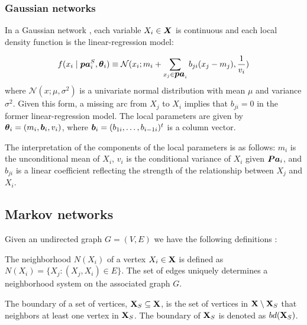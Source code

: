 \documentclass[a4paper]{article}
\begin{document}
\subsubsection{Gaussian networks}


In a Gaussian network \cite{Shachter_and_Kenley:1989}, each variable $X_i \in \mbox{\boldmath $X$}$ is continuous and
each local density function is the linear-regression model:

\begin{equation}
f (x{_i} \mid \mbox{\boldmath $pa$}_{i}^{S}, \mbox{\boldmath $\theta$}_i) \equiv  {\mathcal{N}} (x_i; m_i + \sum _{x_{j} \in \mbox{\boldmath $pa$}_{i}} b_{ji} (x_j - m_j), \frac{1}{v_i})
\end{equation}
where ${\mathcal{N}} (x; \mu, \sigma^{2})$ is a univariate normal
distribution with mean $\mu$ and variance $\sigma^{2}$. Given this form, a missing arc from $X_j$ to $X_i$
implies that $b_{ji} = 0$ in the former linear-regression model.
The local parameters are given by  $\mbox{\boldmath $\theta$}_i =
(m_i,  \mbox{\boldmath $b$}_i, v_i)$, where $\mbox{\boldmath
$b$}_i= (b_{1i}, \ldots, b_{i-1i})^t$ is a column vector.

The interpretation of the components of the local parameters is as
follows: $m_i$ is the unconditional mean of $X_i$, $v_i$ is the
conditional variance of $X_i$ given $\mbox{\boldmath $Pa$}_{i}$,
and $b_{ji}$ is a linear coefficient reflecting the strength of
the relationship between $X_j$ and $X_i$.


\subsection{Markov networks} \label{MRF}

Given an undirected graph $G=(V,E)$ we have the following
definitions \cite{Hammersley_and_Clifford:1968}:

\begin{definition}
   The neighborhood $N(X_i)$ of a vertex $ X_i \in {\bf{X}}$ is defined as
  $N(X_i)  = \{ X_j: (X_j,X_i) \in E \}$. The set of edges uniquely
  determines a neighborhood system on the associated graph $G$.
\label{NEIGHBHOOD}
\end{definition}

\begin{definition}
   The boundary of a set of vertices, ${\bf{X}}_S \subseteq {\bf{X}}$,
 is the set of vertices in $
 {\bf{X}} \setminus {\bf{X}}_S$ that neighbors  at least one vertex in ${\bf{X}}_S$. The boundary
 of ${\bf{X}}_S$ is denoted as $bd({\bf{X}}_S)$.
\label{BOUNDARY}
\end{definition}
\end{document}
